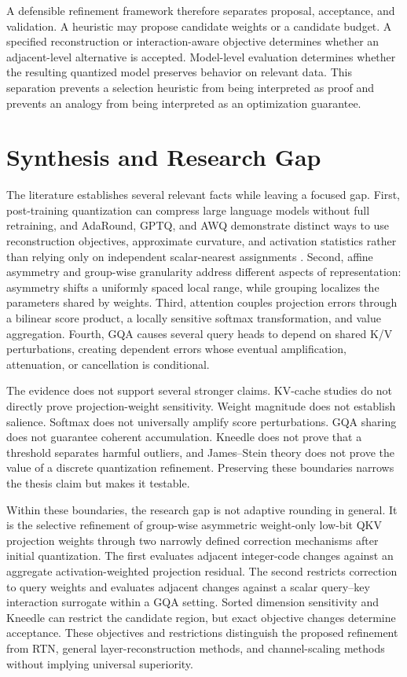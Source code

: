 A defensible refinement framework therefore separates proposal, acceptance, and validation. A heuristic may propose candidate weights or a candidate budget. A specified reconstruction or interaction-aware objective determines whether an adjacent-level alternative is accepted. Model-level evaluation determines whether the resulting quantized model preserves behavior on relevant data. This separation prevents a selection heuristic from being interpreted as proof and prevents an analogy from being interpreted as an optimization guarantee.

\section{Synthesis and Research Gap}

The literature establishes several relevant facts while leaving a focused gap. First, post-training quantization can compress large language models without full retraining, and AdaRound, GPTQ, and AWQ demonstrate distinct ways to use reconstruction objectives, approximate curvature, and activation statistics rather than relying only on independent scalar-nearest assignments \cite{nagel2020adaround,frantar2022gptq,lin2023awq}. Second, affine asymmetry and group-wise granularity address different aspects of representation: asymmetry shifts a uniformly spaced local range, while grouping localizes the parameters shared by weights. Third, attention couples projection errors through a bilinear score product, a locally sensitive softmax transformation, and value aggregation. Fourth, GQA causes several query heads to depend on shared K/V perturbations, creating dependent errors whose eventual amplification, attenuation, or cancellation is conditional.

The evidence does not support several stronger claims. KV-cache studies do not directly prove projection-weight sensitivity. Weight magnitude does not establish salience. Softmax does not universally amplify score perturbations. GQA sharing does not guarantee coherent accumulation. Kneedle does not prove that a threshold separates harmful outliers, and James--Stein theory does not prove the value of a discrete quantization refinement. Preserving these boundaries narrows the thesis claim but makes it testable.

Within these boundaries, the research gap is not adaptive rounding in general. It is the selective refinement of group-wise asymmetric weight-only low-bit QKV projection weights through two narrowly defined correction mechanisms after initial quantization. The first evaluates adjacent integer-code changes against an aggregate activation-weighted projection residual. The second restricts correction to query weights and evaluates adjacent changes against a scalar query--key interaction surrogate within a GQA setting. Sorted dimension sensitivity and Kneedle can restrict the candidate region, but exact objective changes determine acceptance. These objectives and restrictions distinguish the proposed refinement from RTN, general layer-reconstruction methods, and channel-scaling methods without implying universal superiority.

